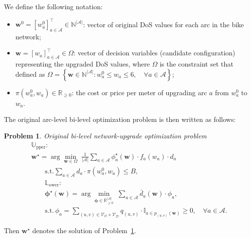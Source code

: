 \documentclass[lettersize,journal]{IEEEtran}
\newtheorem{problem}{Problem}
\begin{document}
We define the following notation:
\begin{itemize}
    \item $\mathbf{w}^{0} = \left [  w_{a}^{0} \right ]_{a \in \mathcal{A}}^\top \in \mathbb{N}^{|\mathcal{A}|}$: vector of original DoS values for each arc in the bike network;
    \item $\mathbf{w} = \left [   w_{a} \right ]_{a \in \mathcal{A}}^\top \in \Omega$: vector of decision variables (candidate configuration) representing the upgraded DoS values, where $\Omega$ is the constraint set that defined as 
$\Omega
=
\left\{
\mathbf{w}\in
\mathbb{N}^{|\mathcal{A}|}
:
w_a^{0}
\leq
w_a
\leq
6,\quad
\forall a\in\mathcal{A}
\right\}$;
\item $\pi(w_{a}^{0},w_{a})  \in \mathbb{R}_{\geq 0}$: the cost or price per meter of upgrading arc $a$ from $w_{a}^{0}$ to $w_{a}$. 
\end{itemize}
The original arc-level bi-level optimization problem is then written as follows:
\begin{problem}{Original bi-level network-upgrade optimization problem}\label{bi-levelorig}
\begin{align}
& \mathbb{U}_{\mathrm{pper}}: \nonumber \\[0.2em]
& \mathbf{w}^{\star}
=
\arg\min_{\mathbf{w}\in\Omega}
\;
\frac{1}{|\mathcal{A}|}\sum_{a\in\mathcal{A}}
\phi_a^{\star}(\mathbf{w})
\cdot
f_a(w_a)
\cdot
d_a
\label{eq:upper_arc}
\\
& \quad \quad  \mathrm{s.t. }
\sum_{a\in\mathcal{A}}
d_a
\cdot
\pi(w_a^{0},w_a)
\leq B,
\label{eq:budget_arc}
\\[0.5em]
& \quad \quad \mathbb{L}_{\mathrm{ower}}: \nonumber \\[0.2em]
& \quad \quad
\boldsymbol{\phi}^{\star}
(\boldsymbol{w})
=
\arg\min_{\boldsymbol{\phi}\in
\mathbb{R}_{\geq 0}^{|\mathcal{A}|}}
\;
\sum_{a\in\mathcal{A}}
\bar{d}_a(\mathbf{w})
\cdot
\phi_a,
\label{eq:lower_arc}
\\
& \quad \quad 
\mathrm{s.t.}\,
\phi_a
=
\sum_{(u,v)\in
\mathcal{V}_{\mathcal{O}}
\times
\mathcal{V}_{\mathcal{D}}}
q_{(u,v)}
\cdot
\mathbb{I}_{
a\in p_{(u,v)}
(\mathbf{w})
}
\geq 0,
\quad
\forall a\in\mathcal{A}.
\nonumber
\end{align}
\end{problem}
Then $\mathbf{w}^{\star}$ denotes the solution of Problem~\ref{bi-levelorig}.
\end{document}

